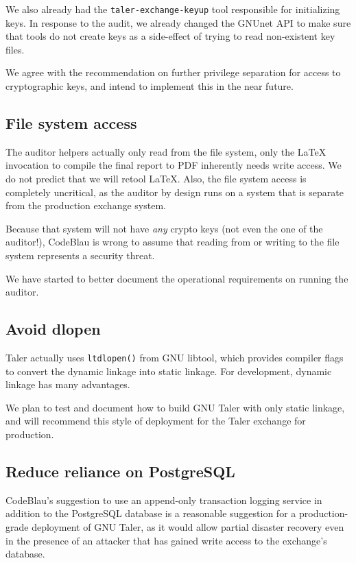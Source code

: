 \documentclass[11pt]{article}
\begin{document}
We also already had the {\tt taler-exchange-keyup} tool responsible for
initializing keys. In response to the audit, we already changed the GNUnet API
to make sure that tools do not create keys as a side-effect of trying to read
non-existent key files.

We agree with the recommendation on further privilege separation for access
to cryptographic keys, and intend to implement this in the near future.

\subsection{File system access}

The auditor helpers actually only read from the file system, only the LaTeX
invocation to compile the final report to PDF inherently needs write
access. We do not predict that we will retool LaTeX.  Also, the file system
access is completely uncritical, as the auditor by design runs on a system
that is separate from the production exchange system.

Because that system will not have {\em any} crypto keys (not even the one of
the auditor!), CodeBlau is wrong to assume that reading from or writing to the
file system represents a security threat.

We have started to better document the operational requirements on running the
auditor.

\subsection{Avoid dlopen}

Taler actually uses {\tt ltdlopen()} from GNU libtool, which provides
compiler flags to convert the dynamic linkage into static linkage.  For
development, dynamic linkage has many advantages.

We plan to test and document how to build GNU Taler with only static
linkage, and will recommend this style of deployment for the Taler
exchange for production.

\subsection{Reduce reliance on PostgreSQL}

CodeBlau's suggestion to use an append-only transaction logging service in
addition to the PostgreSQL database is a reasonable suggestion for a
production-grade deployment of GNU Taler, as it would allow partial disaster
recovery even in the presence of an attacker that has gained write access to
the exchange's database.
\end{document}
